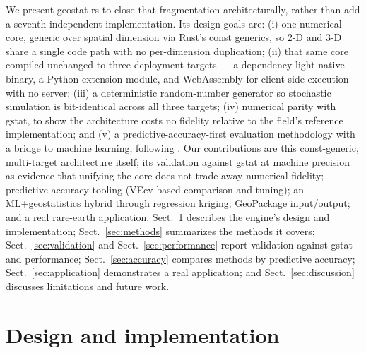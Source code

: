 \documentclass[pdflatex,sn-mathphys-ay]{sn-jnl}
\begin{document}
We present geostat-rs to close that fragmentation architecturally, rather than
add a seventh independent implementation. Its design goals are: (i) one
numerical core, generic over spatial dimension via Rust's const generics, so
2-D and 3-D share a single code path with no per-dimension duplication;
(ii) that same core compiled unchanged to three deployment targets --- a
dependency-light native binary, a Python extension module, and WebAssembly for
client-side execution with no server; (iii) a deterministic random-number
generator so stochastic simulation is bit-identical across all three targets;
(iv) numerical parity with gstat, to show the architecture costs no fidelity
relative to the field's reference implementation; and (v) a
predictive-accuracy-first evaluation methodology with a bridge to machine
learning, following \citet{li2021}. Our contributions are this const-generic,
multi-target architecture itself; its validation against gstat at machine
precision as evidence that unifying the core does not trade away numerical
fidelity; predictive-accuracy tooling (VEcv-based comparison and tuning); an
ML+geostatistics hybrid through regression kriging; GeoPackage input/output;
and a real rare-earth application. Sect.~\ref{sec:design} describes the
engine's design and implementation; Sect.~\ref{sec:methods} summarizes the
methods it covers; Sect.~\ref{sec:validation} and Sect.~\ref{sec:performance}
report validation against gstat and performance; Sect.~\ref{sec:accuracy}
compares methods by predictive accuracy; Sect.~\ref{sec:application}
demonstrates a real application; and Sect.~\ref{sec:discussion} discusses
limitations and future work.

\section{Design and implementation}\label{sec:design}
\end{document}
